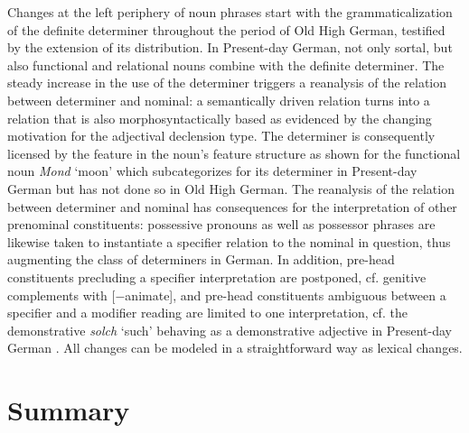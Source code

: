 \documentclass[output=paper
	        ,collection
	        ,collectionchapter
 	        ,biblatex
                ,babelshorthands
                ,newtxmath
                ,draftmode
                ,colorlinks, citecolor=brown
]{./langsci/langscibook}
\begin{document}
Changes at the left periphery of noun phrases start with the grammaticalization of the definite determiner throughout the period of Old High German, testified by the extension of its distribution. In Present-day German, not only sortal, but also functional and relational nouns combine with the definite determiner. The steady increase in the use of the determiner triggers a reanalysis of the relation between determiner and nominal: a semantically driven relation turns into a relation that is also morphosyntactically based as evidenced by the changing motivation for the adjectival declension type. The determiner is consequently licensed by the \cat feature in the noun's feature structure as shown for the functional noun \textit{Mond} `moon' which subcategorizes for its determiner in Present-day German but has not done so in Old High German.
\ea \label{noun}
\z 
The reanalysis of the relation between determiner and nominal has consequences for the interpretation of other prenominal constituents: possessive pronouns as well as possessor phrases are likewise taken to instantiate a specifier relation to the nominal in question, thus augmenting the class of determiners in German. In addition, pre-head constituents precluding a specifier interpretation are postponed, cf. genitive complements with [$-$animate], and pre-head constituents ambiguous between a specifier and a modifier reading are limited to one interpretation, cf. the demonstrative \textit{solch} `such' behaving as a demonstrative adjective in Present-day German \citep{demske2005}. All changes can be modeled in a straightforward way as lexical changes.  

\section{Summary} 
\end{document}
